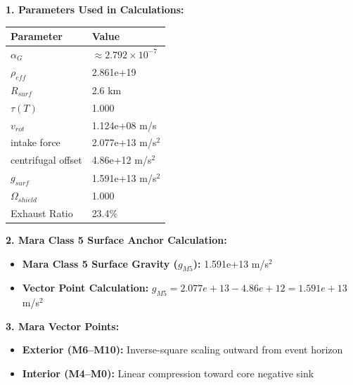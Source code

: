 \documentclass[11pt, a4paper]{article}
\begin{document}
\vspace{0.5em}
\noindent \textbf{1. Parameters Used in Calculations:}
\begin{center}
  \begin{tabular}{|l|l|}
    \hline
    \textbf{Parameter} & \textbf{Value} \\ \hline
    $\alpha_G$ & $\approx 2.792 \times 10^{-7}$ \\ \hline
    $\rho_{eff}$ & 2.861e+19 \\ \hline
    $R_{surf}$ & 2.6 km \\ \hline
    $\tau(T)$ & 1.000 \\ \hline
    $v_{rot}$ & 1.124e+08 m/s \\ \hline
    intake force & 2.077e+13 m/s$^2$ \\ \hline
    centrifugal offset & 4.86e+12 m/s$^2$ \\ \hline
    $g_{surf}$ & 1.591e+13 m/s$^2$ \\ \hline
    $\Omega_{shield}$ & 1.000 \\ \hline
    Exhaust Ratio & 23.4\% \\ \hline
  \end{tabular}
\end{center}

\vspace{0.5em}
\noindent \textbf{2. Mara Class 5 Surface Anchor Calculation:}
\begin{itemize}
  \item \textbf{Mara Class 5 Surface Gravity ($g_{M5}$):} 1.591e+13 m/s$^2$
  \item \textbf{Vector Point Calculation:} $g_{M5} = 2.077e+13 - 4.86e+12 = 1.591e+13$ m/s$^2$
\end{itemize}

\vspace{0.5em}
\noindent \textbf{3. Mara Vector Points:}
\begin{itemize}
  \item \textbf{Exterior (M6--M10):} Inverse-square scaling outward from event horizon
  \item \textbf{Interior (M4--M0):} Linear compression toward core negative sink
\end{itemize}
\end{document}
